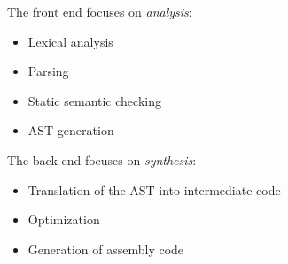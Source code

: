 \documentclass{plt}
\begin{document}
\begin{frame}

The front end focuses on \emph{analysis}:

\begin{itemize}
\item Lexical analysis

\item Parsing

\item Static semantic checking

\item AST generation
\end{itemize}

The back end focuses on \emph{synthesis}:

\begin{itemize}
\item Translation of the AST into intermediate code

\item Optimization

\item Generation of assembly code
\end{itemize}

\end{frame}
\end{document}
